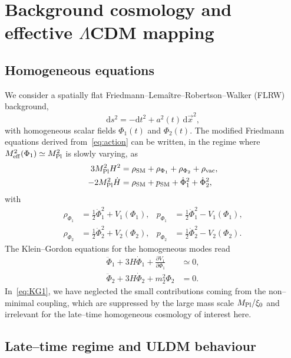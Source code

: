 \documentclass[aps,prd,onecolumn,nofootinbib,superscriptaddress]{revtex4-2}
\newcommand{\Mpl}{M_{\rm Pl}}
\newcommand{\Meff}{M_{\rm eff}}
\newcommand{\dd}{\mathrm{d}}
\begin{document}
\section{Background cosmology and effective $\Lambda$CDM mapping}
\label{sec:background}

\subsection{Homogeneous equations}

We consider a spatially flat Friedmann--Lemaître--Robertson--Walker (FLRW) background,
\begin{equation}
  \dd s^2 = -\dd t^2 + a^2(t)\,\dd\vec{x}^2,
\end{equation}
with homogeneous scalar fields $\Phi_1(t)$ and $\Phi_2(t)$.
The modified Friedmann equations derived from~\eqref{eq:action} can be written, in the regime where $\Meff^2(\Phi_1)\simeq\Mpl^2$ is slowly varying, as
\begin{align}
  3\Mpl^2 H^2
  &= \rho_{\rm SM} + \rho_{\Phi_1} + \rho_{\Phi_2} + \rho_{\rm vac},
  \label{eq:Friedmann1}
  \\
  -2\Mpl^2 \dot H
  &= \rho_{\rm SM}+p_{\rm SM} + \dot\Phi_1^2 + \dot\Phi_2^2,
  \label{eq:Friedmann2}
\end{align}
with
\begin{align}
  \rho_{\Phi_1}
  &= \frac12 \dot\Phi_1^2 + V_1(\Phi_1),
  &
  p_{\Phi_1}
  &= \frac12 \dot\Phi_1^2 - V_1(\Phi_1),
  \\
  \rho_{\Phi_2}
  &= \frac12 \dot\Phi_2^2 + V_2(\Phi_2),
  &
  p_{\Phi_2}
  &= \frac12 \dot\Phi_2^2 - V_2(\Phi_2).
\end{align}
The Klein--Gordon equations for the homogeneous modes read
\begin{align}
  \ddot\Phi_1 + 3H\dot\Phi_1 + \frac{\partial V_1}{\partial\Phi_1}
  &\simeq 0,
  \label{eq:KG1}
  \\
  \ddot\Phi_2 + 3H\dot\Phi_2 + m_2^2 \Phi_2
  &= 0.
  \label{eq:KG2}
\end{align}
In~\eqref{eq:KG1}, we have neglected the small contributions coming from the non--minimal coupling, which are suppressed by the large mass scale $\Mpl/\xi_0$ and irrelevant for the late--time homogeneous cosmology of interest here.

\subsection{Late--time regime and ULDM behaviour}
\end{document}
